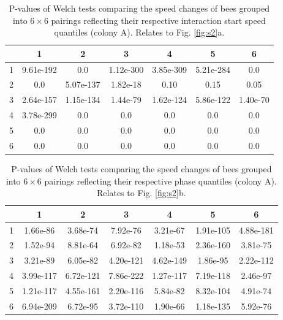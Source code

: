 \documentclass{article}
\begin{document}
\begin{table}[h!]
\centering
\def\tablename{Supplementary Table}
\caption{
P-values of Welch tests comparing the speed changes of bees grouped into $6 \times 6$ pairings reflecting their respective interaction start speed quantiles (colony A). Relates to Fig. \ref{fig:s2}a.
}
\begin{tabular}{|c|c|c|c|c|c|c|}
\hline
 & 1 & 2 & 3 & 4 & 5 & 6 \\ \hline
1 & 9.61e-192 & 0.0 & 1.12e-300 & 3.85e-309 & 5.21e-284 & 0.0 \\ \hline
2 & 0.0 & 5.07e-137 & 1.82e-18 & 0.10 & 0.15 & 0.05 \\ \hline
3 & 2.64e-157 & 1.15e-134 & 1.44e-79 & 1.62e-124 & 5.86e-122 & 1.40e-70 \\ \hline
4 & 3.78e-299 & 0.0 & 0.0 & 0.0 & 0.0 & 0.0 \\ \hline
5 & 0.0 & 0.0 & 0.0 & 0.0 & 0.0 & 0.0 \\ \hline
6 & 0.0 & 0.0 & 0.0 & 0.0 & 0.0 & 0.0 \\ \hline
\end{tabular}
\end{table}


\begin{table}[h!]
\centering
\def\tablename{Supplementary Table}
\caption{
P-values of Welch tests comparing the speed changes of bees grouped into $6 \times 6$ pairings reflecting their respective phase quantiles (colony A). Relates to Fig. \ref{fig:s2}b.
}
\begin{tabular}{|c|c|c|c|c|c|c|}
\hline
 & 1 & 2 & 3 & 4 & 5 & 6 \\ \hline
1 & 1.66e-86 & 3.68e-74 & 7.92e-76 & 3.21e-67 & 1.91e-105 & 4.88e-181 \\ \hline
2 & 1.52e-94 & 8.81e-64 & 6.92e-82 & 1.18e-53 & 2.36e-160 & 3.81e-75 \\ \hline
3 & 3.21e-89 & 6.05e-82 & 4.20e-121 & 4.62e-149 & 1.86e-95 & 2.22e-112 \\ \hline
4 & 3.99e-117 & 6.72e-121 & 7.86e-222 & 1.27e-117 & 7.19e-118 & 2.46e-97 \\ \hline
5 & 1.21e-117 & 4.55e-161 & 2.20e-116 & 5.84e-82 & 8.32e-104 & 4.91e-74 \\ \hline
6 & 6.94e-209 & 6.72e-95 & 3.72e-110 & 1.90e-66 & 1.18e-135 & 5.92e-76 \\ \hline
\end{tabular}
\end{table}
\end{document}

